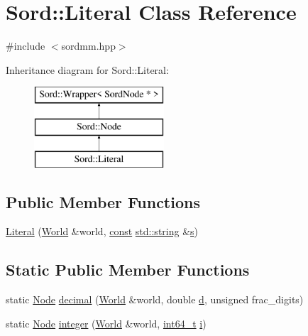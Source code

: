 \hypertarget{class_sord_1_1_literal}{}\section{Sord\+:\+:Literal Class Reference}
\label{class_sord_1_1_literal}


{\ttfamily \#include $<$sordmm.\+hpp$>$}

Inheritance diagram for Sord\+:\+:Literal\+:\begin{figure}[H]
\begin{center}
\leavevmode
\includegraphics[height=3.000000cm]{class_sord_1_1_literal}
\end{center}
\end{figure}
\subsection*{Public Member Functions}
\begin{DoxyCompactItemize}
\item 
\hyperlink{class_sord_1_1_literal_acb1e3ca812777edf0f25c042b8539754}{Literal} (\hyperlink{class_sord_1_1_world}{World} \&world, \hyperlink{getopt1_8c_a2c212835823e3c54a8ab6d95c652660e}{const} \hyperlink{test__lib_f_l_a_c_2format_8c_ab02026ad0de9fb6c1b4233deb0a00c75}{std\+::string} \&\hyperlink{lib_2expat_8h_a755339d27872b13735c2cab829e47157}{s})
\end{DoxyCompactItemize}
\subsection*{Static Public Member Functions}
\begin{DoxyCompactItemize}
\item 
static \hyperlink{class_sord_1_1_node}{Node} \hyperlink{class_sord_1_1_literal_a48c136e2bf0bcdba3828d0cab7c9579f}{decimal} (\hyperlink{class_sord_1_1_world}{World} \&world, double \hyperlink{poly-fir_8h_a2530554172d8629149ec56816eeaa947}{d}, unsigned frac\+\_\+digits)
\item 
static \hyperlink{class_sord_1_1_node}{Node} \hyperlink{class_sord_1_1_literal_a854d32e6e605ad5614e67c9b752492eb}{integer} (\hyperlink{class_sord_1_1_world}{World} \&world, \hyperlink{lib-src_2ffmpeg_2win32_2stdint_8h_a67a9885ef4908cb72ce26d75b694386c}{int64\+\_\+t} \hyperlink{checksum_8c_ab80e330a3bc9e38c1297fe17381e92b4}{i})
\end{DoxyCompactItemize}
